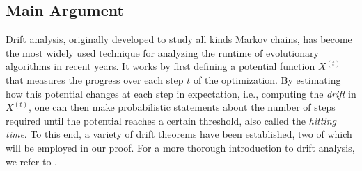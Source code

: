 \subsection{Main Argument}

Drift analysis, originally developed to study all kinds Markov chains, has become the most widely used technique for analyzing the runtime of evolutionary algorithms in recent years. It works by first defining a potential function $X^{(t)}$ that measures the progress over each step $t$ of the optimization. By estimating how this potential changes at each step in expectation, i.e., computing the \emph{drift} in $X^{(t)}$, one can then make probabilistic statements about the  number of steps required until the potential reaches a certain threshold, also called the \emph{hitting time}. To this end, a variety of drift theorems have been established, two of which will be employed in our proof. For a more thorough introduction to drift analysis, we refer to \citet{drift_analysis_lengler}.


